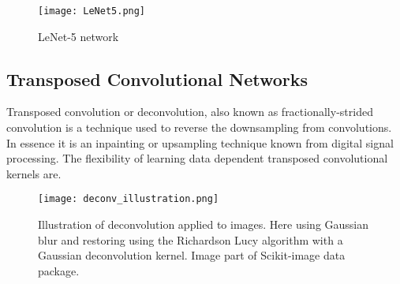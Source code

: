 \documentclass[../../thesis.tex]{subfiles}
\begin{document}
\begin{figure}[h]
    \centering
    \texttt{[image: LeNet5.png]}
    \caption{LeNet-5 network \cite{LeCun1989ConvNet}}
    \label{fig:LeNet5}
\end{figure}


\subsection{Transposed Convolutional Networks}
Transposed convolution or deconvolution, also known as fractionally-strided convolution is a technique used to reverse the downsampling from convolutions. In essence it is an inpainting or upsampling technique known from digital signal processing. The flexibility of learning data dependent transposed convolutional kernels are. 

\begin{figure}[h]
    \centering
    \texttt{[image: deconv\_illustration.png]}
    \caption{Illustration of deconvolution applied to images. Here using Gaussian blur and restoring using the Richardson Lucy algorithm with a Gaussian deconvolution kernel. Image part of Scikit-image data package.}
\end{figure}










\end{document}
